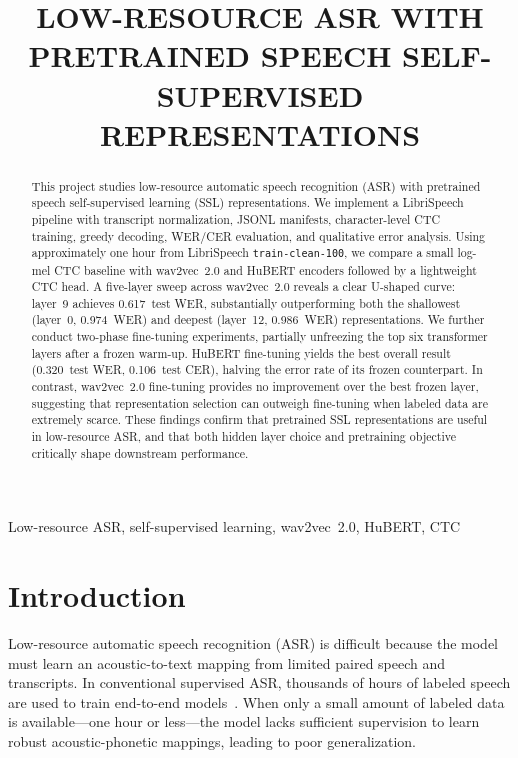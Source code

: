 \documentclass{article}
\title{LOW-RESOURCE ASR WITH PRETRAINED SPEECH SELF-SUPERVISED REPRESENTATIONS}
\begin{document}
\maketitle

\begin{abstract}
This project studies low-resource automatic speech recognition (ASR) with
pretrained speech self-supervised learning (SSL) representations. We implement
a LibriSpeech pipeline with transcript normalization, JSONL manifests,
character-level CTC training, greedy decoding, WER/CER evaluation, and
qualitative error analysis. Using approximately one hour from LibriSpeech
\texttt{train-clean-100}, we compare a small log-mel CTC baseline with
wav2vec~2.0 and HuBERT encoders followed by a lightweight CTC head. A
five-layer sweep across wav2vec~2.0 reveals a clear U-shaped curve: layer~9
achieves 0.617~test WER, substantially outperforming both the shallowest
(layer~0, 0.974~WER) and deepest (layer~12, 0.986~WER) representations.
We further conduct two-phase fine-tuning experiments, partially unfreezing the
top six transformer layers after a frozen warm-up. HuBERT fine-tuning yields
the best overall result (0.320~test WER, 0.106~test CER), halving the error
rate of its frozen counterpart. In contrast, wav2vec~2.0 fine-tuning provides
no improvement over the best frozen layer, suggesting that representation
selection can outweigh fine-tuning when labeled data are extremely scarce.
These findings confirm that pretrained SSL representations are useful in
low-resource ASR, and that both hidden layer choice and pretraining objective
critically shape downstream performance.
\end{abstract}

\begin{keywords}
Low-resource ASR, self-supervised learning, wav2vec~2.0, HuBERT, CTC
\end{keywords}

\section{Introduction}

Low-resource automatic speech recognition (ASR) is difficult because the model
must learn an acoustic-to-text mapping from limited paired speech and
transcripts. In conventional supervised ASR, thousands of hours of labeled
speech are used to train end-to-end models~\cite{panayotov2015librispeech}.
When only a small amount of labeled data is available---one hour or less---the
model lacks sufficient supervision to learn robust acoustic-phonetic mappings,
leading to poor generalization.
\end{document}

